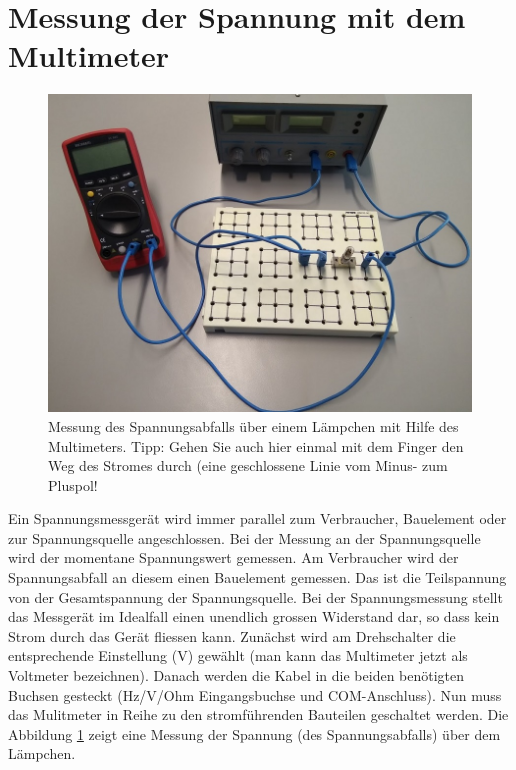 \documentclass[11pt,twoside=false,open=any]{scrbook}
\begin{document}
\section{Messung der Spannung mit dem Multimeter}

\begin{figure}[h]
\centering
\includegraphics[scale=0.45]{Bilder/spannung.jpg}
\caption{Messung des Spannungsabfalls über einem Lämpchen mit Hilfe des Multimeters. Tipp: Gehen Sie auch hier einmal mit dem Finger den Weg des Stromes durch (eine geschlossene Linie vom Minus- zum Pluspol!}
\label{fig:spannung}
\end{figure}

Ein Spannungsmessgerät wird immer parallel zum Verbraucher, Bauelement oder zur Spannungsquelle angeschlossen. Bei der Messung an der Spannungsquelle wird der momentane Spannungswert gemessen. Am Verbraucher wird der Spannungsabfall an diesem einen Bauelement gemessen. Das ist die Teilspannung von der Gesamtspannung der Spannungsquelle. Bei der Spannungsmessung stellt das Messgerät im Idealfall einen unendlich grossen Widerstand dar, so dass kein Strom durch das Gerät fliessen kann. Zunächst wird am Drehschalter die entsprechende Einstellung (\si{\volt}) gewählt (man kann das Multimeter jetzt als Voltmeter bezeichnen). Danach werden die Kabel in die beiden benötigten Buchsen gesteckt (Hz/V/Ohm Eingangsbuchse und COM-Anschluss). Nun muss das Mulitmeter in Reihe zu den stromführenden Bauteilen geschaltet werden. Die Abbildung \ref{fig:spannung} zeigt eine Messung der Spannung (des Spannungsabfalls) über dem Lämpchen.
\end{document}

